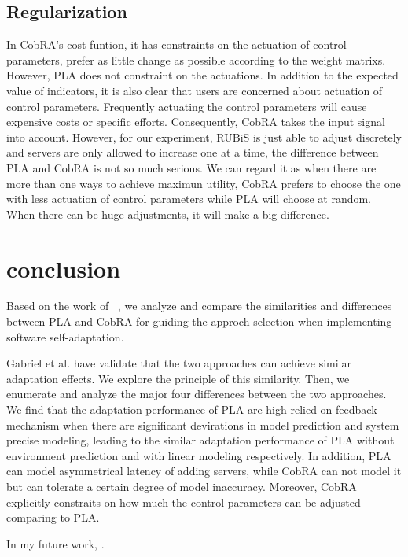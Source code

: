 \documentclass[sigconf]{acmart}
\begin{document}
\subsection{Regularization}
In CobRA's cost-funtion, it has constraints on the actuation of control parameters, prefer as little change as possible according to the weight matrixs. However, PLA does not constraint on the actuations. In addition to the expected value of indicators, it is also clear that users are concerned about actuation of control parameters. Frequently actuating the control parameters will cause expensive costs or specific efforts. Consequently, CobRA takes the input signal into account. However, for our experiment, RUBiS is just able to adjust discretely and servers are only allowed to increase one at a time, the difference between PLA and CobRA is not so much serious. We can regard it as when there are more than one ways to achieve maximun utility, CobRA prefers to choose the one with less actuation of control parameters while PLA will choose at random. When there can be huge adjustments, it will make a big difference.

\section{conclusion}
Based on the work of ~\cite{moreno2017comparing}, we analyze and compare the similarities and differences between PLA and CobRA for guiding the approch selection when implementing software self-adaptation.

Gabriel et al. have validate that the two approaches can achieve similar adaptation effects. We explore the principle of this similarity. Then, we enumerate and analyze the major four differences between the two approaches. We find that the adaptation performance of PLA are high relied on feedback mechanism when there are significant devirations in model prediction and system precise modeling, leading to the similar adaptation performance of PLA without environment prediction and with linear modeling respectively. In addition, PLA can model asymmetrical latency of adding servers, while CobRA can not model it but can tolerate a certain degree of model inaccuracy. Moreover, CobRA explicitly constraits on how much the control parameters can be adjusted comparing to PLA.

In my future work, .


\end{document}
